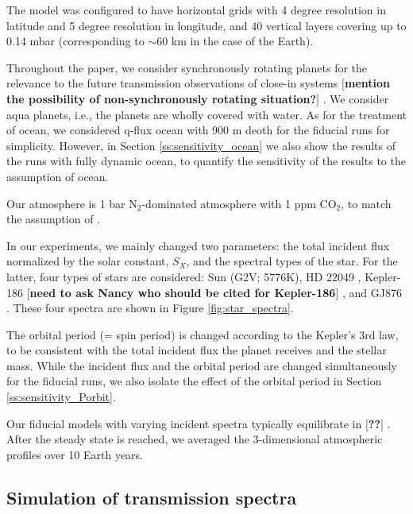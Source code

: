 \documentclass[11pt,numberedappendix,twocolappendix,]{emulateapj}
\def\memo#1{\color{red}$[${\bf #1}$]$ \color{black}}
\begin{document}
The model was configured to have horizontal grids with 4 degree resolution in latitude and 5 degree resolution in longitude, and 40 vertical layers covering up to 0.14 mbar (corresponding to $\sim 60$ km in the case of the Earth). 

Throughout the paper, we consider synchronously rotating planets for the relevance to the future transmission observations of close-in systems \memo{mention the possibility of non-synchronously rotating situation?}. 
We consider aqua planets, i.e., the planets are wholly covered with water. 
As for the treatment of ocean, we considered q-flux ocean with 900 m deoth for the fiducial runs for simplicity. However, in Section \ref{ss:sensitivity_ocean} we also show the results of the runs with fully dynamic ocean, to quantify the sensitivity of the results to the assumption of ocean. 

Our atmosphere is 1 bar N$_2$-dominated atmosphere with 1 ppm CO$_2$, to match the assumption of \citet{Kopparapu2016}. 

In our experiments, we mainly changed two parameters: the total incident flux normalized by the solar constant, $S_X$, and the spectral types of the star. 
For the latter, four types of stars are considered: Sun (G2V; 5776K), HD 22049 \citep[][K2V, 5084K, $0.82M_{\odot }$, $0.73R_{\odot }$]{Segura2003}, Kepler-186 \citep[][M1V, 3755K, $0.54M_{\odot }$, $0.52R_{\odot }$]{}\memo{need to ask Nancy who should be cited for Kepler-186}, and GJ876 \citep[][M4V, 3473K, $0.334M_{\odot }$, $0.36R_{\odot }$]{Domagal-Goldman2014}. 
These four spectra are shown in Figure \ref{fig:star_spectra}. 

The orbital period (= spin period) is changed according to the Kepler's 3rd law, to be consistent with the total incident flux the planet receives and the stellar mass. While the incident flux and the orbital period are changed simultaneously for the fiducial runs, we also isolate the effect of the orbital period in Section \ref{ss:sensitivity_Porbit}. 

Our fiducial models with varying incident spectra typically equilibrate in \memo{??}. 
After the steady state is reached, we averaged the 3-dimensional atmospheric profiles over 10 Earth years. 



\subsection{Simulation of transmission spectra}
\end{document}

